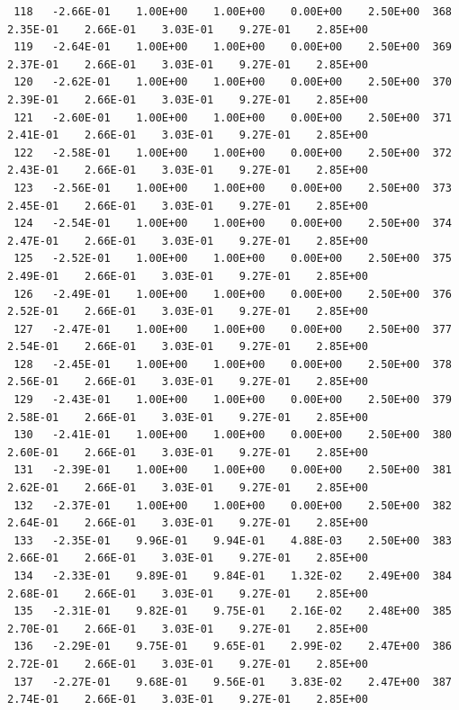 \documentclass[10pt,letterpaper,notitlepage]{article}
\numberwithin{equation}{section}
\begin{document}
\begin{appendices}
{\begin{verbatim}
 118   -2.66E-01    1.00E+00    1.00E+00    0.00E+00    2.50E+00  368    2.35E-01    2.66E-01    3.03E-01    9.27E-01    2.85E+00
 119   -2.64E-01    1.00E+00    1.00E+00    0.00E+00    2.50E+00  369    2.37E-01    2.66E-01    3.03E-01    9.27E-01    2.85E+00
 120   -2.62E-01    1.00E+00    1.00E+00    0.00E+00    2.50E+00  370    2.39E-01    2.66E-01    3.03E-01    9.27E-01    2.85E+00
 121   -2.60E-01    1.00E+00    1.00E+00    0.00E+00    2.50E+00  371    2.41E-01    2.66E-01    3.03E-01    9.27E-01    2.85E+00
 122   -2.58E-01    1.00E+00    1.00E+00    0.00E+00    2.50E+00  372    2.43E-01    2.66E-01    3.03E-01    9.27E-01    2.85E+00
 123   -2.56E-01    1.00E+00    1.00E+00    0.00E+00    2.50E+00  373    2.45E-01    2.66E-01    3.03E-01    9.27E-01    2.85E+00
 124   -2.54E-01    1.00E+00    1.00E+00    0.00E+00    2.50E+00  374    2.47E-01    2.66E-01    3.03E-01    9.27E-01    2.85E+00
 125   -2.52E-01    1.00E+00    1.00E+00    0.00E+00    2.50E+00  375    2.49E-01    2.66E-01    3.03E-01    9.27E-01    2.85E+00
 126   -2.49E-01    1.00E+00    1.00E+00    0.00E+00    2.50E+00  376    2.52E-01    2.66E-01    3.03E-01    9.27E-01    2.85E+00
 127   -2.47E-01    1.00E+00    1.00E+00    0.00E+00    2.50E+00  377    2.54E-01    2.66E-01    3.03E-01    9.27E-01    2.85E+00
 128   -2.45E-01    1.00E+00    1.00E+00    0.00E+00    2.50E+00  378    2.56E-01    2.66E-01    3.03E-01    9.27E-01    2.85E+00
 129   -2.43E-01    1.00E+00    1.00E+00    0.00E+00    2.50E+00  379    2.58E-01    2.66E-01    3.03E-01    9.27E-01    2.85E+00
 130   -2.41E-01    1.00E+00    1.00E+00    0.00E+00    2.50E+00  380    2.60E-01    2.66E-01    3.03E-01    9.27E-01    2.85E+00
 131   -2.39E-01    1.00E+00    1.00E+00    0.00E+00    2.50E+00  381    2.62E-01    2.66E-01    3.03E-01    9.27E-01    2.85E+00
 132   -2.37E-01    1.00E+00    1.00E+00    0.00E+00    2.50E+00  382    2.64E-01    2.66E-01    3.03E-01    9.27E-01    2.85E+00
 133   -2.35E-01    9.96E-01    9.94E-01    4.88E-03    2.50E+00  383    2.66E-01    2.66E-01    3.03E-01    9.27E-01    2.85E+00
 134   -2.33E-01    9.89E-01    9.84E-01    1.32E-02    2.49E+00  384    2.68E-01    2.66E-01    3.03E-01    9.27E-01    2.85E+00
 135   -2.31E-01    9.82E-01    9.75E-01    2.16E-02    2.48E+00  385    2.70E-01    2.66E-01    3.03E-01    9.27E-01    2.85E+00
 136   -2.29E-01    9.75E-01    9.65E-01    2.99E-02    2.47E+00  386    2.72E-01    2.66E-01    3.03E-01    9.27E-01    2.85E+00
 137   -2.27E-01    9.68E-01    9.56E-01    3.83E-02    2.47E+00  387    2.74E-01    2.66E-01    3.03E-01    9.27E-01    2.85E+00

\end{verbatim}}
\end{appendices}
\end{document}
